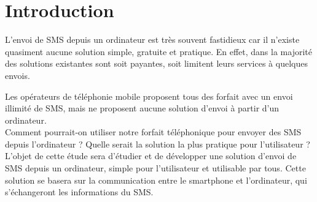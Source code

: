 \newpage



\chapter*{Introduction}


L'envoi de SMS depuis un ordinateur est très souvent fastidieux car il n'existe quasiment aucune solution simple, gratuite et pratique.
En effet, dans la majorité des solutions existantes sont soit payantes, soit limitent leurs services à quelques envois.

Les opérateurs de téléphonie mobile proposent tous des forfait avec un envoi illimité de SMS, mais ne proposent aucune solution d'envoi à partir d'un ordinateur.
\\




Comment pourrait-on utiliser notre forfait téléphonique pour envoyer des SMS depuis l'ordinateur ?
Quelle serait la solution la plus pratique pour l'utilisateur ?
\\




L'objet de cette étude sera d'étudier et de développer une solution d'envoi de SMS depuis un ordinateur, simple pour l'utilisateur et utilisable par tous.
Cette solution se basera sur la communication entre le smartphone et l'ordinateur, qui s'échangeront les informations du SMS.
\\




